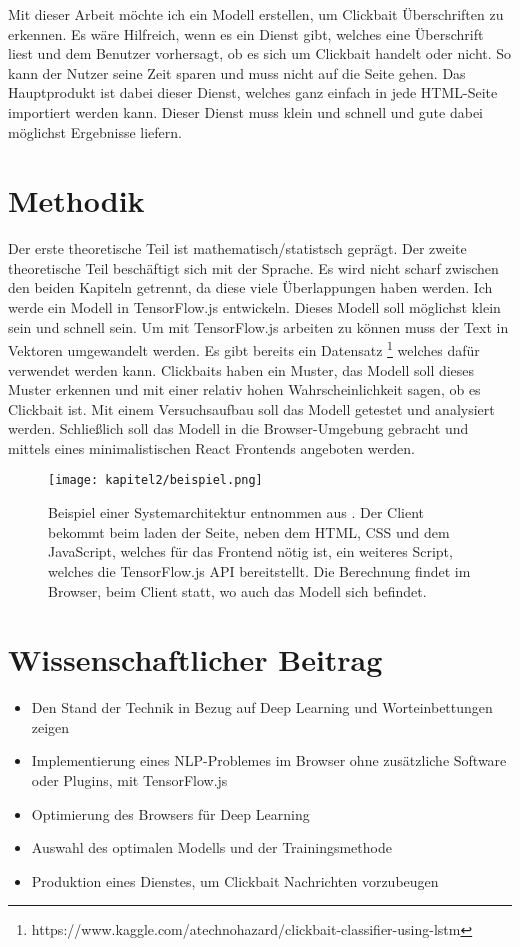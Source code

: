 Mit dieser Arbeit möchte ich ein Modell erstellen, um Clickbait Überschriften zu erkennen. Es wäre Hilfreich, wenn es ein Dienst gibt, welches eine Überschrift liest und dem Benutzer vorhersagt, ob es sich um Clickbait handelt oder nicht. So kann der Nutzer seine Zeit sparen und muss nicht auf die Seite gehen. Das Hauptprodukt ist dabei dieser Dienst, welches ganz einfach in jede HTML-Seite importiert werden kann. Dieser Dienst muss klein und schnell und gute dabei möglichst Ergebnisse liefern.

\section{Methodik}

Der erste theoretische Teil ist mathematisch/statistsch geprägt. Der zweite theoretische Teil beschäftigt sich mit der Sprache. Es wird nicht scharf zwischen den beiden Kapiteln getrennt, da diese viele Überlappungen haben werden. Ich werde ein Modell in TensorFlow.js entwickeln. Dieses Modell soll möglichst klein sein und schnell sein. Um mit TensorFlow.js arbeiten zu können muss der Text in Vektoren umgewandelt werden. Es gibt bereits ein Datensatz \footnote{https://www.kaggle.com/atechnohazard/clickbait-classifier-using-lstm} welches dafür verwendet werden kann. Clickbaits haben ein Muster, das Modell soll dieses Muster erkennen und mit einer relativ hohen Wahrscheinlichkeit sagen, ob es Clickbait ist. Mit einem Versuchsaufbau soll das Modell getestet und analysiert werden. Schließlich soll das Modell in die Browser-Umgebung gebracht und mittels eines minimalistischen React Frontends angeboten werden.

\begin{figure}[ht]
  \centering
  \texttt{[image: kapitel2/beispiel.png]}
  \caption[Beispiel einer Systemarchitektur]{Beispiel einer Systemarchitektur entnommen aus \cite{cho2019shop}. Der Client bekommt beim laden der Seite, neben dem HTML, CSS und dem JavaScript, welches für das Frontend nötig ist, ein weiteres Script, welches die TensorFlow.js API bereitstellt. Die Berechnung findet im Browser, beim Client statt, wo auch das Modell sich befindet.}
  \label{Kap2:SystemArchitektur}
\end{figure}
 
\section{Wissenschaftlicher Beitrag}
\begin{itemize}
  \item Den Stand der Technik in Bezug auf Deep Learning und Worteinbettungen zeigen
  \item Implementierung eines NLP-Problemes im Browser ohne zusätzliche Software oder Plugins, mit TensorFlow.js
  \item Optimierung des Browsers für Deep Learning 
  \item Auswahl des optimalen Modells und der Trainingsmethode
  \item Produktion eines Dienstes, um Clickbait Nachrichten vorzubeugen
\end{itemize}

